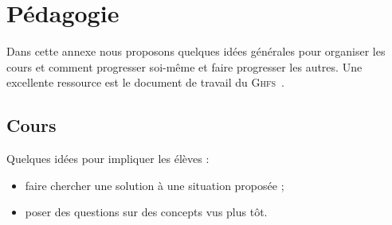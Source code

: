 \chapter{Pédagogie}

Dans cette annexe nous proposons quelques idées générales pour organiser les cours et comment progresser soi-même et faire progresser les autres.
Une excellente ressource est le document de travail du \textsc{Ghfs}~\cite{linnard:how_we_train}.




\section{Cours}


Quelques idées pour impliquer les élèves :
\begin{itemize}
	\item faire chercher une solution à une situation proposée ;
	\item poser des questions sur des concepts vus plus tôt.
\end{itemize}

